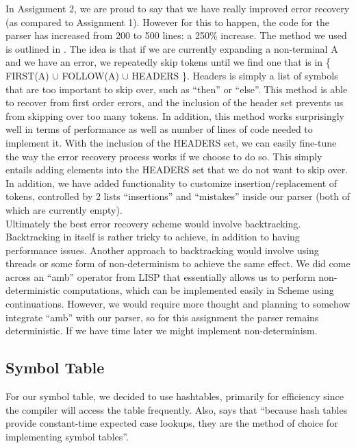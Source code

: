 \documentclass[onecolumn,11pt]{article}
\begin{document}
In Assignment 2, we are proud to say that we have really improved error recovery (as compared to Assignment 1). However for this to happen, the code for the parser has increased from 200 to 500 lines: a 250\% increase. The method we used is outlined in \cite{fischer88}. The idea is that if we are currently expanding a non-terminal A and we have an error, we repeatedly skip tokens until we find one that is in \{ FIRST(A) $\cup$ FOLLOW(A) $\cup$ HEADERS \}. Headers is simply a list of symbols that are too important to skip over, such as ``then'' or ``else''. This method is able to recover from first order errors, and the inclusion of the header set prevents us from skipping over too many tokens. In addition, this method works surprisingly well in terms of performance as well as number of lines of code needed to implement it. With the inclusion of the HEADERS set, we can easily fine-tune the way the error recovery process works if we choose to do so. This simply entails adding elements into the HEADERS set that we do not want to skip over. In addition, we have added functionality to customize insertion/replacement of tokens, controlled by 2 lists ``insertions'' and ``mistakes'' inside our parser (both of which are currently empty). \\

Ultimately the best error recovery scheme would involve backtracking. Backtracking in itself is rather tricky to achieve, in addition to having performance issues. Another approach to backtracking would involve using threads or some form of non-determinism to achieve the same effect. We did come across an ``amb'' operator from LISP that essentially allows us to perform non-deterministic computations, which can be implemented easily in Scheme using continuations. However, we would require more thought and planning to somehow integrate ``amb'' with our parser, so for this assignment the parser remains deterministic. If we have time later we might implement non-determinism. \\

\subsection{Symbol Table}

For our symbol table, we decided to use hashtables, primarily for efficiency since the compiler will access the table frequently. Also, \cite{cooper04} says that ``because hash tables provide constant-time expected case lookups, they are the method of choice for implementing symbol tables''. \\
\end{document}
